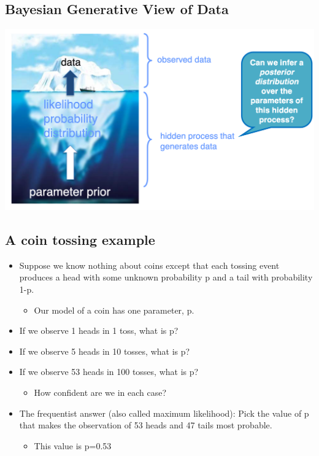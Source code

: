 \documentclass[11pt]{article}
\theoremstyle{definition}
\begin{document}
\subsection{Bayesian Generative View of Data}
\includegraphics[width=\textwidth/2]{3.png}

\subsection{A coin tossing example}
\begin{itemize}
    \item Suppose we know nothing about coins except that each tossing
    event produces a head with some unknown probability p and a
    tail with probability 1-p.
    \begin{itemize}
        \item Our model of a coin has one parameter, p.
    \end{itemize}
    \item If we observe 1 heads in 1 toss, what is p?
    \item If we observe 5 heads in 10 tosses, what is p?
    \item If we observe 53 heads in 100 tosses, what is p?
    \begin{itemize}
        \item How confident are we in each case?
    \end{itemize}
    \item The frequentist answer (also called maximum likelihood):
    Pick the value of p that makes the observation of 53 heads and
    47 tails most probable.
    \begin{itemize}
        \item This value is p=0.53
    \end{itemize}
\end{itemize}
\end{document}
